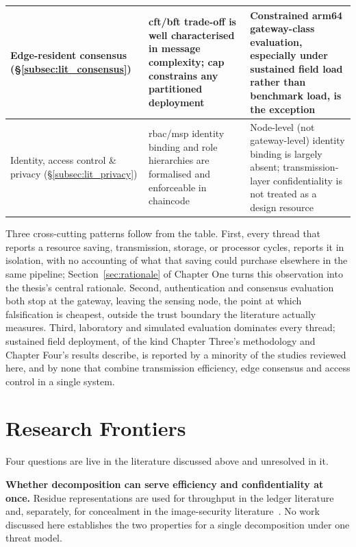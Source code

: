 \documentclass[12pt,a4paper,oneside]{book}
\begin{document}
\begin{table}[htbp]
\begin{tabularx}{\textwidth}{@{}p{}X X@{}}
\midrule
Edge-resident consensus (\S\ref{subsec:lit_consensus})
  & \gls{cft}/\gls{bft} trade-off is well characterised in message
    complexity; \gls{cap} constrains any partitioned deployment
  & Constrained \gls{arm64} gateway-class evaluation, especially under
    sustained field load rather than benchmark load, is the exception \\
\midrule
Identity, access control \& privacy (\S\ref{subsec:lit_privacy})
  & \gls{rbac}/\gls{msp} identity binding and role hierarchies are
    formalised and enforceable in chaincode
  & Node-level (not gateway-level) identity binding is largely absent;
    transmission-layer confidentiality is not treated as a design resource \\
\bottomrule
\end{tabularx}
\end{table}

Three cross-cutting patterns follow from the table. First, every thread
that reports a resource saving, transmission, storage, or processor
cycles, reports it in isolation, with no accounting of what that saving
could purchase elsewhere in the same pipeline; Section~\ref{sec:rationale}
of Chapter One turns this observation into the thesis's central rationale.
Second, authentication and consensus evaluation both stop at the gateway,
leaving the sensing node, the point at which falsification is cheapest,
outside the trust boundary the literature actually measures. Third,
laboratory and simulated evaluation dominates every thread; sustained
field deployment, of the kind Chapter Three's methodology and Chapter
Four's results describe, is reported by a minority of the studies
reviewed here, and by none that combine transmission efficiency, edge
consensus and access control in a single system.

\section{Research Frontiers}
\label{sec:lit_frontiers}

Four questions are live in the literature discussed above and unresolved in it.

\textbf{Whether decomposition can serve efficiency and confidentiality at
once.} Residue representations are used for throughput in the ledger
literature~\cite{horvath2025assistedsharding, patel2023blockchainlayer} and,
separately, for concealment in the image-security
literature~\cite{yavuz2025reversibledata}. No work discussed here establishes
the two properties for a single decomposition under one threat model.
\end{document}
